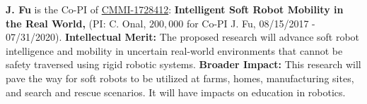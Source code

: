 \documentclass[letterpaper, 11 pt, onecolumn]{article}
\begin{document}
\textbf{J. Fu} is the Co-PI of
\underline{CMMI-1728412}: \textbf{Intelligent Soft Robot Mobility in
  the Real World,} (PI: C. Onal, $200,000$ for Co-PI J. Fu, 08/15/2017
- 07/31/2020). \textbf{Intellectual Merit:} The proposed research will
advance soft robot intelligence and mobility in uncertain real-world
environments that cannot be safety traversed using rigid robotic
systems.  \textbf{Broader Impact:} This research will pave the way for
soft robots to be utilized at farms, homes, manufacturing sites, and
search and rescue scenarios. It will have impacts on education in
robotics.




\pagebreak
\setcounter{page}{1}







% 
\end{document}
